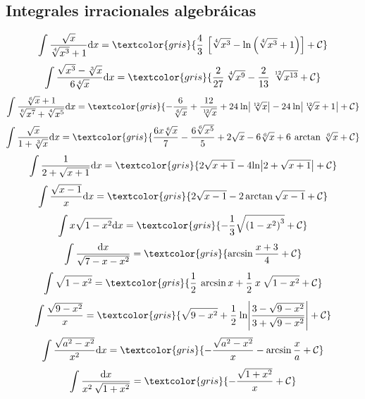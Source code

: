 {\begin{fleqn}
	\subsection*{Integrales irracionales algebráicas}
	
	\begin{equation}
		\int \frac{\sqrt{x}}{\sqrt[4]{x^3}+1}\mathrm{d}x=\textcolor{gris}{\frac 4 3 \: \left[ \sqrt[4]{x^3}-\mathrm{ln} \left( \sqrt[4]{x^3}+1 \right) \right]+\mathcal C}
	\end{equation}
	\begin{equation}
		\int \frac{\sqrt{x^3}-\sqrt[3]{x}}{6\sqrt[4]{x}}	\mathrm{d}x=\textcolor{gris}{\frac{2}{27}\: \sqrt[4]{x^9}-\frac{2}{13}\: \sqrt[12]{x^{13}}+\mathcal C}
		\end{equation}
	\begin{equation}
			\int \frac{\sqrt[6]{x}+1}{\sqrt[6]{x^7}+\sqrt[4]{x^5}}\mathrm{d}x=\textcolor{gris}{-\frac{6}{\sqrt[6]{x}}+\frac{12}{\sqrt[12]{x}}+24\: \mathrm{ln} \abs{\sqrt[12]{x}}-24\: \mathrm{ln} \abs{\sqrt[12]{x}+1}+\mathcal C}
		\end{equation}
	\begin{equation}
			\int \frac{\sqrt x}{1+\sqrt[3]x}\mathrm{d}x=\textcolor{gris}{\frac{6x\sqrt [6]{x}}{7}-\frac{6\sqrt[6]{x^5}}{5}+2\sqrt{x}-6\sqrt[6]x+6\: \arctan\: \sqrt[6]x+\mathcal C}
		\end{equation}
	\begin{equation}
			\int \frac{1}{2+\sqrt{x+1}}\mathrm{d}x=\textcolor{gris}{2\sqrt{x+1}-4 \mathrm{ln} \abs{2+\sqrt{x+1}}+\mathcal C}
		\end{equation}
	\begin{equation}
			\int \frac{\sqrt{x-1}}{x}\mathrm{d}x=\textcolor{gris}{2\sqrt{x-1}-2 \arctan \sqrt{x-1}+\mathcal C}
		\end{equation}
	\begin{equation}
			\int x\sqrt{1-x^2}\mathrm{d}x=\textcolor{gris}{-\frac{1}{3}\sqrt{{(1-x^2)}^3}+\mathcal C}
		\end{equation}
	\begin{equation}
			\int \frac{\mathrm{d}x}{\sqrt{7-x-x^2}}=\textcolor{gris}{\arcsin \frac{x+3}{4}+\mathcal C}
		\end{equation}
	\begin{equation}
			\int \sqrt {1-x^2}	= \textcolor{gris}{\frac 1 2 \: \arcsin x+\frac 1 2 \: x\:\sqrt{1-x^2}+\mathcal C}			
		\end{equation}
	\begin{equation}
			\int \frac{\sqrt{9-x^2}}{x} = \textcolor{gris}{\sqrt{9-x^2}+\frac 1 2 \: \mathrm{ln} \abs{\frac{3-\sqrt{9-x^2}}{3+\sqrt{9-x^2}}}+\mathcal C}
		\end{equation}		
	\begin{equation}
			\int \frac{\sqrt{a^2-x^2}}{x^2}	\mathrm{d}x=\textcolor{gris}{	-\frac{\sqrt{a^2-x^2}}{x}-\arcsin \frac x a +\mathcal C}
		\end{equation}
	\begin{equation}
			\int \frac{\mathrm{d}x}{x^2\: \sqrt{1+x^2}}=\textcolor{gris}{-\frac{\sqrt{1+x^2}}{x}+\mathcal C}
		\end{equation}


\end{fleqn}}
